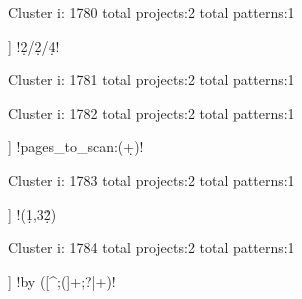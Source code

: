 Cluster i: 1780
total projects:2
total patterns:1
\begin{multicols}{1}
\begin{description}[noitemsep,topsep=0pt]
\item [[2] ] \cverb!\d{2}/\d{2}/\d{4}!
\end{description}
\end{multicols}







Cluster i: 1781
total projects:2
total patterns:1
\begin{multicols}{1}
\begin{description}[noitemsep,topsep=0pt]
\item [[2] ] \cverb!(^|\\n)([^\\]*)$!
\end{description}
\end{multicols}







Cluster i: 1782
total projects:2
total patterns:1
\begin{multicols}{1}
\begin{description}[noitemsep,topsep=0pt]
\item [[2] ] \cverb!pages_to_scan:(\d+)!
\end{description}
\end{multicols}







Cluster i: 1783
total projects:2
total patterns:1
\begin{multicols}{1}
\begin{description}[noitemsep,topsep=0pt]
\item [[2] ] \cverb!(\d{1,3}\.\d{2})%
\end{description}
\end{multicols}







Cluster i: 1784
total projects:2
total patterns:1
\begin{multicols}{1}
\begin{description}[noitemsep,topsep=0pt]
\item [[2] ] \cverb!by ([^;(\n]+;?|\w+)!
\end{description}
\end{multicols}







